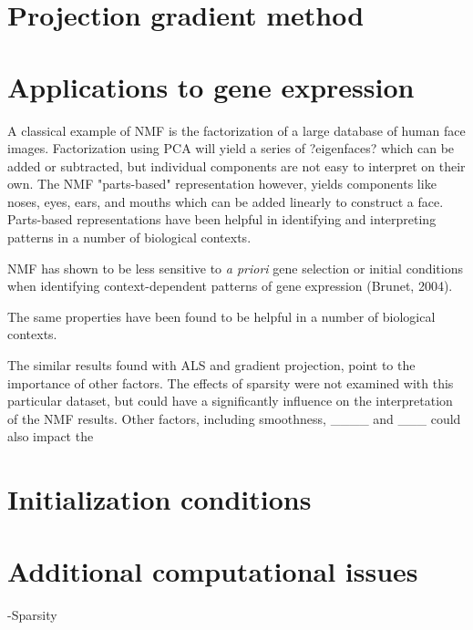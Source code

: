 \documentclass[final,leqno,onefignum,onetabnum]{siamltex1213}
\begin{document}
\section{Projection gradient method} 


\section{Applications to gene expression}
A classical example of NMF is the factorization of a large database of human face images. Factorization using PCA will yield a series of ?eigenfaces? which can be added or subtracted, but individual components are not easy to interpret on their own. The NMF "parts-based" representation however, yields components like noses, eyes, ears, and mouths which can be added linearly to construct a face. Parts-based representations have been helpful in identifying and interpreting patterns in a number of biological contexts. 

NMF has shown to be less sensitive to \textit{a priori} gene selection or initial conditions when identifying context-dependent patterns of gene expression (Brunet, 2004). 

The same properties have been found to be helpful in a number of biological contexts. 

The similar results found with ALS and gradient projection, point to the importance of other factors. The effects of sparsity were not examined with this particular dataset, but could have a significantly influence on the interpretation of the NMF results. Other factors, including smoothness, ____ and ___ could also impact the 

\section{Initialization conditions}

\section{Additional computational issues}
-Sparsity 
\end{document}
